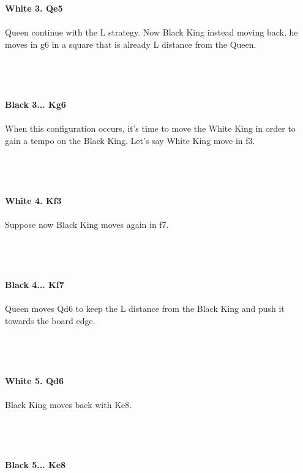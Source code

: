 \documentclass{article}
\begin{document}
\\
\\
\textbf{White 3. Qe5}\\
\\
Queen continue with the L strategy. Now Black King instead moving back, he moves in g6 in a square that is already L distance from the Queen.\\\\
\\

\\
\\
\textbf{Black 3... Kg6}\\
\\
When this configuration occurs, it's time to move the White King in order to gain a tempo on the Black King. Let's say White King move in f3.\\\\
\\

\\
\\
\textbf{White 4. Kf3}\\
\\
Suppose now Black King moves again in f7.\\\\
\\

\\
\\
\textbf{Black 4... Kf7}\\
\\
Queen moves Qd6 to keep the L distance from the Black King and push it towards the board edge.\\\\
\\

\\
\\
\textbf{White 5. Qd6}\\
\\
Black King moves back with Ke8.\\\\
\\

\\
\\
\textbf{Black 5... Ke8}\\
\\
\end{document}
